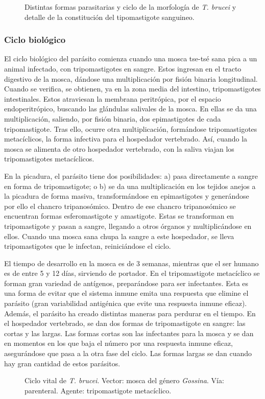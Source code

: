 \begin{figure}[H]
	\caption[Morfología de \textit{T. brucei}]{Distintas formas parasitarias y ciclo de la morfología de \textit{T. brucei} y detalle de la constitución del tipomastigote sanguineo.\label{fig:PARASIT:TBruceiMorf}}
\end{figure}
\subsubsection{Ciclo biológico}
El ciclo biológico del parásito comienza cuando una mosca tse-tsé sana pica a un animal infectado, con tripomastigotes en sangre. Estos ingresan en el  tracto digestivo de la mosca, dándose una multiplicación por fisión binaria longitudinal. Cuando se verifica, se obtienen, ya en la zona media del intestino, tripomastigotes intestinales. Estos atraviesan la membrana peritrópica, por el espacio endoperitrópico, buscando las glándulas salivales de la mosca. En ellas se da una multiplicación, saliendo, por fisión binaria, dos epimastigotes de cada tripomastigote. Tras ello, ocurre otra multiplicación, formándose tripomastigotes metacíclicos, la forma infectiva para el hospedador vertebrado. Así, cuando la mosca se alimenta de otro hospedador vertebrado, con la saliva viajan los tripomastigotes metacíclicos.

En la picadura, el parásito tiene dos posibilidades: a) pasa directamente a sangre en forma de tripomastigote; o b) se da una multiplicación en los tejidos anejos a la picadura de forma masiva, transformándose en epimastigotes y generándose por ello el chancro tripanosómico. Dentro de ese chancro tripanosómico se encuentran formas esferomastigote y amastigote. Estas se transforman en tripomastigote y pasan a sangre, llegando a otros órganos y multiplicándose en ellos. Cuando una mosca sana chupa la sangre a este hospedador, se lleva tripomastigotes que le infectan, reiniciándose el ciclo.

El tiempo de desarrollo en la mosca es de 3 semanas, mientras que el ser humano es de entre 5 y 12 días, sirviendo de portador. En el tripomastigote metacíclico se forman gran variedad de antígenos, preparándose para ser infectantes. Esta es una forma de evitar que el sistema inmune emita una respuesta que elimine el parásito (gran variabilidad antigénica que evite una respuesta inmune eficaz). Además, el parásito ha creado distintas maneras para perdurar en el tiempo. En el hospedador vertebrado, se dan dos formas de tripomastigote en sangre: las cortas y las largas. Las formas cortas son las infectantes para la mosca y se dan en  momentos en los que baja el número por una respuesta inmune eficaz, asegurándose que pasa a la otra fase del ciclo. Las formas largas se dan cuando hay gran cantidad de estos parásitos.
\begin{figure}[H]
	\centering
	\caption[Ciclo vital de \textit{T. brucei}]{Ciclo vital de \textit{T. brucei}. Vector: mosca del género \textit{Gossina}. Vía: parenteral. Agente: tripomastigote metacíclico.\label{fig:PARASIT:TBruceiCBios}}
\end{figure}

